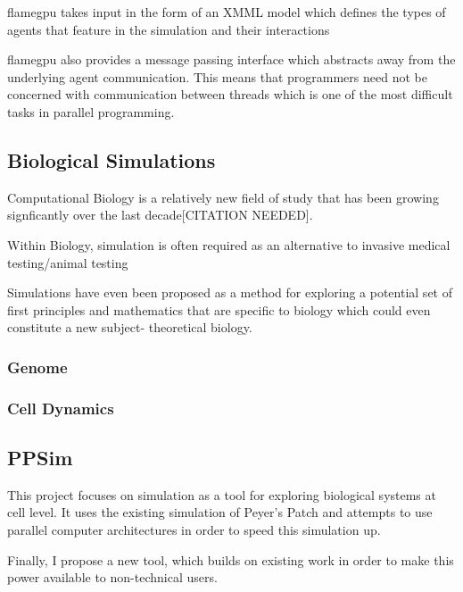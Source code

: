 \documentclass{UoYCSproject}
\begin{document}
\acrshort{flamegpu} takes input in the form of an XMML model which defines the types of agents that feature in the simulation and their interactions%

\acrshort{flamegpu} also provides a message passing interface which abstracts away from the underlying agent communication.
This means that programmers need not be concerned with communication between threads which is one of the most difficult tasks in parallel programming.

\subsection{Biological Simulations}
Computational Biology is a relatively new field of study that has been growing signficantly over the last decade[CITATION NEEDED].

Within Biology, simulation is often required as an alternative to invasive medical testing/animal testing


Simulations have even been proposed as a method for exploring a potential set of first principles and mathematics that are specific to biology which could even constitute a new subject- theoretical biology\cite{rise_article}.

\subsubsection{Genome}


\subsubsection{Cell Dynamics}


\subsection{PPSim}
\label{ppsim}
This project focuses on simulation as a tool for exploring biological systems at cell level. It uses the existing simulation of Peyer's Patch\cite{kieran_thesis} and attempts to use parallel computer architectures in order to speed this simulation up. %

Finally, I propose a new tool, which builds on existing work in order to make this power available to non-technical users.
\end{document}
